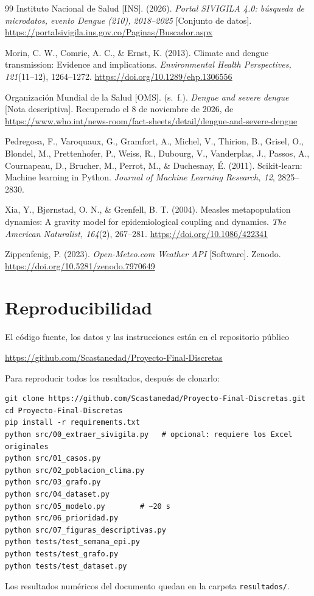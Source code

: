 \documentclass[11pt,letterpaper]{article}
\begin{document}
\begin{thebibliography}{99}
Instituto Nacional de Salud [INS]. (2026). \emph{Portal SIVIGILA 4.0: búsqueda de microdatos, evento Dengue (210), 2018--2025} [Conjunto de datos]. \url{https://portalsivigila.ins.gov.co/Paginas/Buscador.aspx}

Morin, C. W., Comrie, A. C., \& Ernst, K. (2013). Climate and dengue transmission: Evidence and implications. \emph{Environmental Health Perspectives, 121}(11--12), 1264--1272. \url{https://doi.org/10.1289/ehp.1306556}

Organización Mundial de la Salud [OMS]. (s.~f.). \emph{Dengue and severe dengue} [Nota descriptiva]. Recuperado el 8 de noviembre de 2026, de \url{https://www.who.int/news-room/fact-sheets/detail/dengue-and-severe-dengue}

Pedregosa, F., Varoquaux, G., Gramfort, A., Michel, V., Thirion, B., Grisel, O., Blondel, M., Prettenhofer, P., Weiss, R., Dubourg, V., Vanderplas, J., Passos, A., Cournapeau, D., Brucher, M., Perrot, M., \& Duchesnay, É. (2011). Scikit-learn: Machine learning in Python. \emph{Journal of Machine Learning Research, 12}, 2825--2830.

Xia, Y., Bjørnstad, O. N., \& Grenfell, B. T. (2004). Measles metapopulation dynamics: A gravity model for epidemiological coupling and dynamics. \emph{The American Naturalist, 164}(2), 267--281. \url{https://doi.org/10.1086/422341}

Zippenfenig, P. (2023). \emph{Open-Meteo.com Weather API} [Software]. Zenodo. \url{https://doi.org/10.5281/zenodo.7970649}

\end{thebibliography}

\appendix
\section{Reproducibilidad}
El código fuente, los datos y las instrucciones están en el repositorio público
\begin{center}\url{https://github.com/Scastanedad/Proyecto-Final-Discretas}\end{center}
Para reproducir todos los resultados, después de clonarlo:
\begin{verbatim}
git clone https://github.com/Scastanedad/Proyecto-Final-Discretas.git
cd Proyecto-Final-Discretas
pip install -r requirements.txt
python src/00_extraer_sivigila.py   # opcional: requiere los Excel originales
python src/01_casos.py
python src/02_poblacion_clima.py
python src/03_grafo.py
python src/04_dataset.py
python src/05_modelo.py        # ~20 s
python src/06_prioridad.py
python src/07_figuras_descriptivas.py
python tests/test_semana_epi.py
python tests/test_grafo.py
python tests/test_dataset.py
\end{verbatim}
Los resultados numéricos del documento quedan en la carpeta \texttt{resultados/}.
\end{document}
